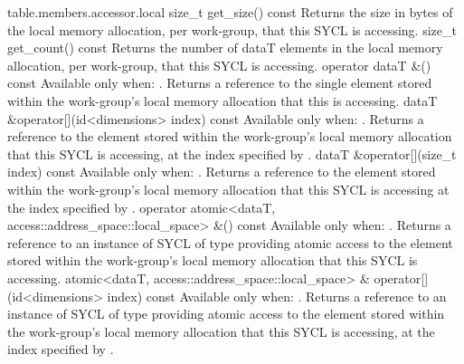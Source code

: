{table.members.accessor.local}
  \addRow
    { size_t get_size() const }
    {
      Returns the size in bytes of the local memory allocation, per work-group,
      that this SYCL  is accessing.
    }
  \addRow
    { size_t get_count() const }
    {
      Returns the number of dataT elements in the local memory allocation, per work-group,
      that this SYCL  is accessing.
    }
  \addRow
    { operator dataT \&() const }
    {
      Available only when: .
      \newline
      Returns a reference to the single element stored within the work-group's local memory
      allocation that this  is accessing.
    }
  \addRow
    { dataT \&operator[](id<dimensions> index) const }
    {
      Available only when: .
      \newline
      Returns a reference to the element stored within the work-group's local memory
      allocation that this SYCL  is accessing, at the index
      specified by .
    }
  \addRow
    { dataT \&operator[](size_t index) const }
    {
      Available only when: .
      \newline
      Returns a reference to the element stored within the work-group's local memory
      allocation that this SYCL  is accessing at the index
      specified by .
    }
  \addRowTwoL
    { operator atomic<dataT, }
    { access::address_space::local_space> \&() const }
    {
      Available only when: .
      \newline
      Returns a reference to an instance of SYCL  of type
       providing atomic access to the element stored within
      the work-group's local memory allocation that this SYCL 
      is accessing.
    }
  \addRowTwoL
    { atomic<dataT, access::address_space::local_space> \& }
    { operator[](id<dimensions> index) const }
    {
      Available only when: .
      \newline
      Returns a reference to an instance of SYCL  of type
       providing atomic access to the element stored within
      the work-group's local memory allocation that this SYCL 
      is accessing, at the index specified by .
    }
